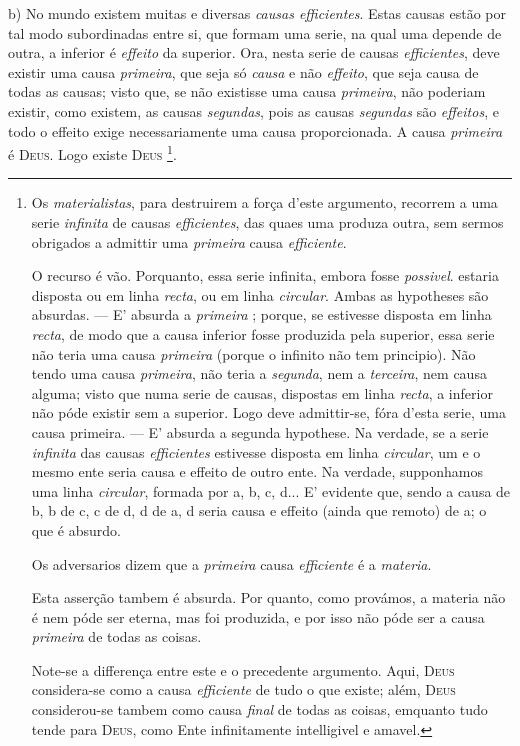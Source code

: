 b) No mundo existem muitas e diversas \emph{causas efficientes}. Estas causas estão por tal modo subordinadas entre si, que formam uma serie, na qual uma depende de outra, a inferior   é \emph{effeito} da superior. Ora, nesta serie de causas \emph{efficientes}, deve existir uma causa \emph{primeira}, que seja só \emph{causa} e não \emph{effeito}, que seja causa de todas as causas; visto que, se não existisse uma  causa \emph{primeira}, não poderiam existir, como existem, as causas \emph{segundas}, pois as causas \emph{segundas} são \emph{effeitos}, e todo o effeito exige necessariamente uma causa proporcionada. A causa \emph{primeira} é \textsc{Deus}. Logo existe \textsc{Deus} \footnote{Os \emph{materialistas}, para destruirem a força d'este argumento, recorrem a uma serie \emph{infinita} de causas \emph{efficientes}, das quaes uma produza outra, sem sermos obrigados a admittir uma \emph{primeira} causa \emph{efficiente}.\par O recurso é vão. Porquanto, essa serie infinita, embora fosse \emph{possivel}. estaria disposta ou em linha \emph{recta}, ou em linha \emph{circular}. Ambas as hypotheses são absurdas. --- E' absurda a \emph{primeira} ; porque, se estivesse disposta em linha \emph{recta}, de modo que a causa inferior fosse produzida pela superior, essa serie não teria uma causa \emph{primeira} (porque o infinito não tem principio). Não tendo uma causa \emph{primeira}, não teria a \emph{segunda}, nem a \emph{terceira}, nem causa alguma; visto que numa serie de causas, dispostas em linha \emph{recta}, a inferior não póde existir sem a superior. Logo deve admittir-se, fóra d'esta serie, uma causa primeira. --- E' absurda a segunda hypothese. Na verdade, se a serie \emph{infinita} das causas \emph{efficientes} estivesse disposta em linha \emph{circular}, um e o mesmo ente seria causa e effeito de outro ente. Na verdade, supponhamos uma linha \emph{circular}, formada por a, b, c, d... E' evidente que, sendo a causa de b, b de c, c de d, d de a, d seria causa e effeito (ainda que remoto) de a; o que é absurdo.\par Os adversarios dizem que a \emph{primeira} causa \emph{efficiente} é a \emph{materia}.\par Esta asserção tambem é absurda. Por quanto, como provámos, a materia não é nem póde ser eterna, mas foi produzida, e por isso não póde ser a causa \emph{primeira} de todas as coisas.\par Note-se a differença entre este e o precedente argumento. Aqui, \textsc{Deus} considera-se como a causa \emph{efficiente} de tudo o que existe; além, \textsc{Deus} considerou-se tambem como causa \emph{final} de todas as coisas, emquanto tudo tende para \textsc{Deus}, como Ente infinitamente intelligivel e amavel.}.

